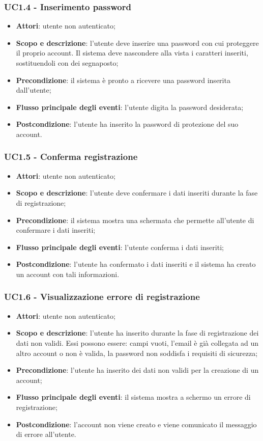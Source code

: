 \subsubsection{UC1.4 - Inserimento password}
\begin{itemize}
\item \textbf{Attori}: utente non autenticato;
\item \textbf{Scopo e descrizione}: l’utente deve inserire una password con cui proteggere il proprio account. Il sistema deve nascondere alla vista i caratteri inseriti, sostituendoli con dei segnaposto;
\item \textbf{Precondizione}: il sistema è pronto a ricevere una password inserita dall’utente;
\item \textbf{Flusso principale degli eventi}: l’utente digita la password desiderata;
\item \textbf{Postcondizione}: l’utente ha inserito la password di protezione del suo account.
\end{itemize}
\subsubsection{UC1.5 - Conferma registrazione}
\begin{itemize}
\item \textbf{Attori}: utente non autenticato;
\item \textbf{Scopo e descrizione}: l’utente deve confermare i dati inseriti durante la fase di registrazione;
\item \textbf{Precondizione}: il sistema mostra una schermata che permette all’utente di confermare i dati inseriti;
\item \textbf{Flusso principale degli eventi}: l’utente conferma i dati inseriti;
\item \textbf{Postcondizione}: l’utente ha confermato i dati inseriti e il sistema ha creato un account con tali informazioni.
\end{itemize}
\subsubsection{UC1.6 - Visualizzazione errore di registrazione}
\begin{itemize}
\item \textbf{Attori}: utente non autenticato;
\item \textbf{Scopo e descrizione}: l’utente ha inserito durante la fase di registrazione dei dati non validi. Essi possono essere: campi vuoti, l’email è già collegata ad un altro account o non è valida, la password non soddisfa i requisiti di sicurezza;
\item \textbf{Precondizione}: l’utente ha inserito dei dati non validi per la creazione di un account;
\item \textbf{Flusso principale degli eventi}: il sistema mostra a schermo un errore di registrazione;
\item \textbf{Postcondizione}: l’account non viene creato e viene comunicato il messaggio di errore all’utente.
\end{itemize}

